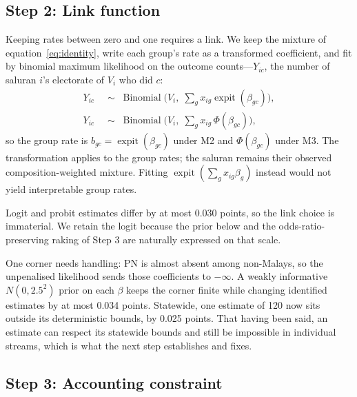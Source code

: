 \documentclass[11pt]{article}
\begin{document}


\subsection{Step 2: Link function}
\label{sec:strategy-link}

Keeping rates between zero and one requires a link. We keep the mixture of equation~\eqref{eq:identity}, write each group's rate as a transformed coefficient, and fit by binomial maximum likelihood on the outcome counts---$Y_{ic}$, the number of saluran $i$'s electorate of $V_i$ who did $c$:
\begin{align}
	Y_{ic} & \;\sim\; \operatorname{Binomial}\!\Big(V_i,\; \sum_g x_{ig}\operatorname{expit}(\beta_{gc})\Big),
	\tag{M2, logit}\label{eq:m2}                                                                               \\
	Y_{ic} & \;\sim\; \operatorname{Binomial}\!\Big(V_i,\; \sum_g x_{ig}\,\Phi(\beta_{gc})\Big),
	\tag{M3, probit}\label{eq:m3}
\end{align}
so the group rate is $b_{gc}=\operatorname{expit}(\beta_{gc})$ under M2 and $\Phi(\beta_{gc})$ under M3. The transformation applies to the group rates; the saluran remains their observed composition-weighted mixture. Fitting $\operatorname{expit}(\sum_g x_{ig}\beta_g)$ instead would not yield interpretable group rates.

Logit and probit estimates differ by at most 0.030 points, so the link choice is immaterial. We retain the logit because the prior below and the odds-ratio-preserving raking of Step 3 are naturally expressed on that scale.

One corner needs handling: PN is almost absent among non-Malays, so the unpenalised likelihood sends those coefficients to $-\infty$. A weakly informative $N(0,2.5^2)$ prior on each $\beta$ \cite{gelman2008} keeps the corner finite while changing identified estimates by at most 0.034 points. Statewide, one estimate of 120 now sits outside its deterministic bounds, by 0.025 points. That having been said, an estimate can respect its statewide bounds and still be impossible in individual streams, which is what the next step establishes and fixes.

\subsection{Step 3: Accounting constraint}
\label{sec:strategy-rake}
\end{document}
